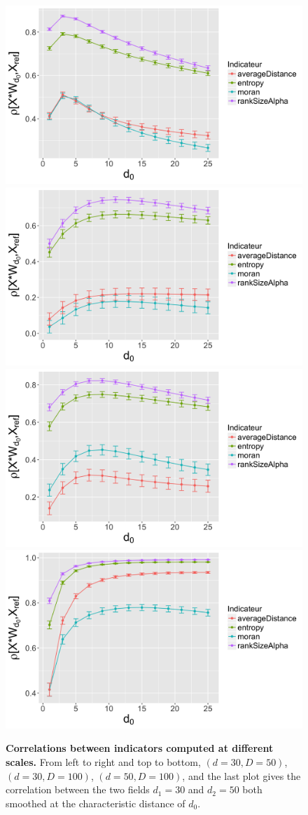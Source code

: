 \begin{figure}
	\includegraphics[width=0.48\linewidth]{figuresraw/sensit_morpho_low60_high100.png}
	\includegraphics[width=0.48\linewidth]{figuresraw/sensit_morpho_low60_high200.png}\\
	\includegraphics[width=0.48\linewidth]{figuresraw/sensit_morpho_low100_high200.png}
	\includegraphics[width=0.48\linewidth]{figuresraw/sensit_morpho_crossed.png}
	\caption{\textbf{Correlations between indicators computed at different scales.} From left to right and top to bottom, $(d=30,D=50)$, $(d=30,D=100)$, $(d=50,D=100)$, and the last plot gives the correlation between the two fields $d_1=30$ and $d_2=50$ both smoothed at the characteristic distance of $d_0$.\label{fig:app:staticcorrelations:sensitivity-corrs}}
\end{figure}







